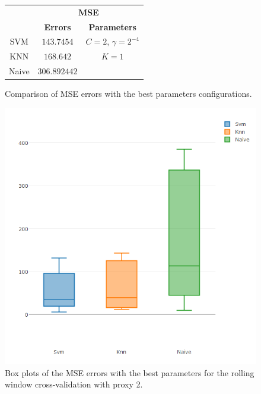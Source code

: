 \begin{figure}[!h]
\centering
\begin{tabular}{|c|c|c|}
   \hline
   & \multicolumn{2}{|c|}{\textbf{MSE}} \\ \cline{2-3}
   & \textbf{Errors} & \textbf{Parameters}          \\ \hline
   SVM  & $143.7454$        & $C = 2$, $\gamma = 2^{-4}$          \\ 
   KNN & $168.642$ & $K = 1$ \\ 
   Naive & $306.892442$ &      \\ 
   \hline
   \end{tabular}
\caption{Comparison of MSE errors with the best parameters configurations.}
\label{fig:table6mMSEp2}
\centering
\includegraphics[width=\linewidth]{img/6mproxy2MSE.png}
\caption{Box plots of the MSE errors with the best parameters for the rolling window cross-validation with proxy 2.}
\end{figure}


